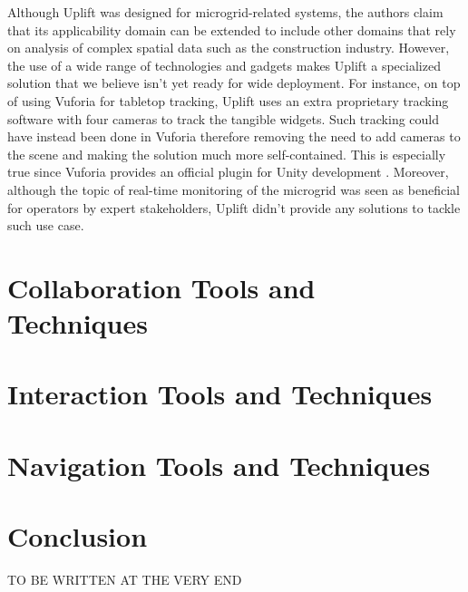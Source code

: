 \documentclass{vgtc}                          %
\begin{document}
\noindent Although Uplift was designed for microgrid-related systems,
the authors claim that its applicability domain can be extended to include
other domains that rely on analysis of complex spatial data such as
the construction industry. However, the use of a wide range of technologies
and gadgets makes Uplift a specialized solution that we believe isn't yet
ready for wide deployment. For instance, on top of using Vuforia for tabletop
tracking, Uplift uses an extra proprietary tracking software with four cameras
to track the tangible widgets. Such tracking could have instead been done in
Vuforia therefore removing the need to add cameras to the scene and making the
solution much more self-contained. This is especially true since Vuforia provides
an official plugin for Unity development \cite{unity:vuforia_plugin}.
Moreover, although the topic of real-time monitoring of the microgrid was seen
as beneficial for operators by expert stakeholders, Uplift didn't provide any
solutions to tackle such use case.

\section{Collaboration Tools and Techniques}
\section{Interaction Tools and Techniques}
\section{Navigation Tools and Techniques}

\section{Conclusion}
TO BE WRITTEN AT THE VERY END

\printbibliography
\end{document}

